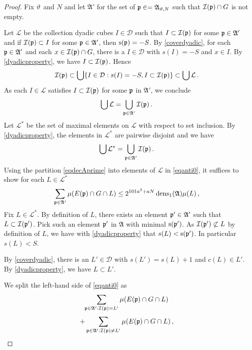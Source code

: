 \begin{proof}
   Fix $\vartheta$ and $N$ and let
$\mathfrak{A}'$ for the set of $\mathfrak p\in=\mathfrak{A}_{\vartheta,N}$ such that $\mathcal{I}(\mathfrak p)\cap G$ is not empty.



   Let $\mathcal{L}$ be the collection dyadic cubes $I\in\mathcal{D}$ such that $I\subset \mathcal{I}(\mathfrak p)$ for some $\mathfrak p\in\mathfrak{A}'$ and if $\mathcal{I}(\mathfrak p)\subset I$ for some $\mathfrak p\in\mathfrak{A}'$, then $\mathrm{s}(\mathfrak p)=-S$. By \eqref{coverdyadic}, for each $\mathfrak p \in \mathfrak{A}'$
   and each $x\in \mathcal{I}(\mathfrak p)\cap G$, there is a $I\in \mathcal{D}$ with $s(I)=-S$ and $x\in I$. By \eqref{dyadicproperty},
   we have $I\subset \mathcal{I}(\mathfrak p)$. Hence
   \begin{equation}
       \mathcal{I}(\mathfrak p)\subset \bigcup\{I\in \mathcal{D}: s(I)=-S, I\subset \mathcal{I}(\mathfrak p)\}\subset \bigcup \mathcal{L}\, .
   \end{equation}
As each $I\in \mathcal{L}$ satisfies $I\subset \mathcal{I}(\mathfrak p)$ for some $\mathfrak p$ in $\mathfrak{A'}$, we conclude
     \begin{equation}
\bigcup\mathcal{L}=\bigcup_{\mathfrak p \in \mathfrak{A}'}\mathcal{I}(\mathfrak p)\, .
   \end{equation}
Let $\mathcal{L}^*$ be the set of maximal elements on $\mathcal{L}$ with respect to set inclusion.
By \eqref{dyadicproperty}, the elements in $\mathcal{L}^*$ are pairwise disjoint and we have
 \begin{equation}\label{eqdecAprime}
\bigcup\mathcal{L}^*=\bigcup_{\mathfrak p \in \mathfrak{A}'}\mathcal{I}(\mathfrak p)\, .
   \end{equation}
Using the partition \eqref{eqdecAprime} into elements of $\mathcal{L}$ in \eqref{eqanti0}, it suffices to show for each $L\in \mathcal{L}^*$
\begin{equation}\label{eqanti0}
    \sum_{\mathfrak p\in\mathfrak{A}'}\mu(E(\mathfrak p)\cap G \cap L)
    \le
2^{101a^3+aN}
\operatorname{\operatorname{dens}}_1(\mathfrak{A})\mu(L)\, ,
\end{equation}
Fix $L\in \mathcal{L}^*$.
By definition of $L$, there exists an element $\mathfrak p'\in \mathfrak{A}'$ such that $L\subset \mathcal{I}(\mathfrak p')$. Pick such an element $\mathfrak p
'$
in $\mathfrak{A}$ with minimal $\mathrm{s}(\mathfrak p')$. As $\mathcal{I}(\mathfrak p')\not \subset L$ by definition of $L$, we have
with \eqref{dyadicproperty} that $s(L)< \mathrm{s}(\mathfrak p')$. In particular $s(L)<S$.

By \eqref{coverdyadic}, there is an
$L'\in \mathcal{D}$ with $s(L')=s(L)+1$ and $c(L)\in L'$. By \eqref{dyadicproperty}, we have
$L\subset L'$.

We split the left-hand side of \eqref{eqanti0} as
\begin{equation}\label{eqanti1}
    \sum_{\mathfrak p\in\mathfrak{A}':\mathcal{I}(\mathfrak p)=L'}\mu(E(\mathfrak p)\cap G\cap L)
\end{equation}
\begin{equation}\label{eqanti2}
    +
     \sum_{\mathfrak p\in\mathfrak{A}':\mathcal{I}(\mathfrak p)\neq L'}\mu(E(\mathfrak p)\cap G\cap L)\, ,
\end{equation}


\end{proof}
